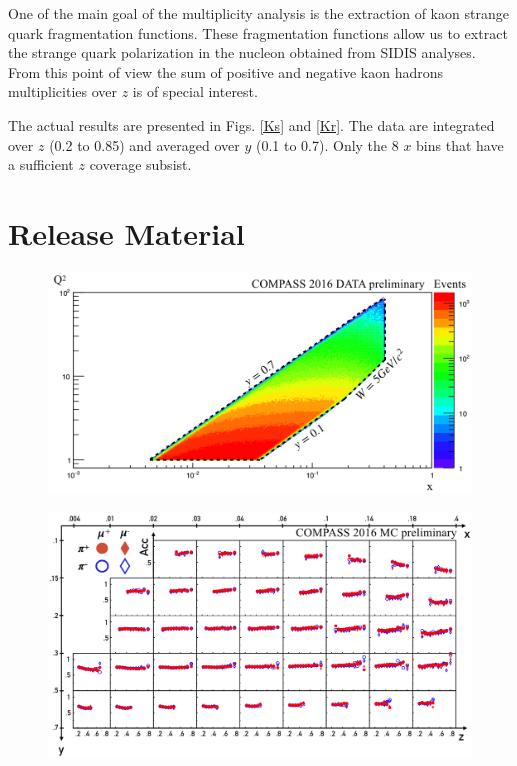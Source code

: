 \documentclass[letterpaper,12pt]{article}
\begin{document}
One of the main goal of the multiplicity analysis is the extraction of kaon strange quark fragmentation functions. These fragmentation functions allow us to extract the strange quark polarization in the nucleon obtained from SIDIS analyses. From this point of view the sum of positive and negative kaon hadrons multiplicities over $z$ is of special interest.

The actual results are presented in Figs. \ref{Ks} and \ref{Kr}. The data are integrated over $z$ (0.2 to 0.85) and averaged over $y$ (0.1 to 0.7). Only the 8 $x$ bins that have a sufficient $z$ coverage subsist.

\newpage

\section{Release Material} \label{RM}

\begin{figure}[H]
	\includegraphics[scale=0.4]{./gfx/xQ2.png}
	\caption{}
	\label{xQ2}
\end{figure}

\begin{figure}
	\includegraphics[scale=0.5]{./gfx/AccPi.png}
	\caption{}
	\label{AccPi}
\end{figure}
\end{document}
